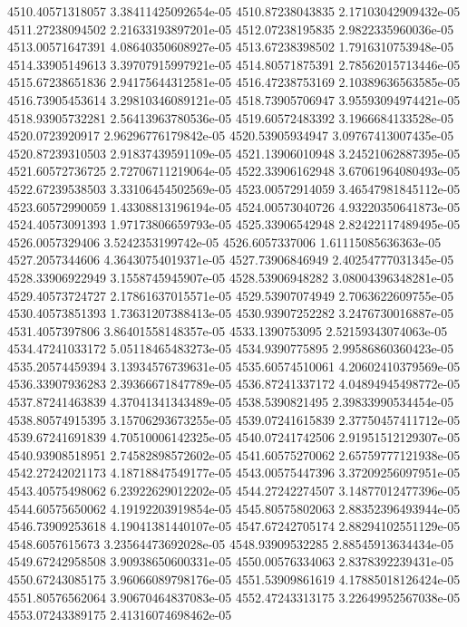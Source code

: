 {4510.40571318057 3.38411425092654e-05
4510.87238043835 2.17103042909432e-05
4511.27238094502 2.21633193897201e-05
4512.07238195835 2.9822335960036e-05
4513.00571647391 4.08640350608927e-05
4513.67238398502 1.7916310753948e-05
4514.33905149613 3.39707915997921e-05
4514.80571875391 2.78562015713446e-05
4515.67238651836 2.94175644312581e-05
4516.47238753169 2.10389636563585e-05
4516.73905453614 3.29810346089121e-05
4518.73905706947 3.95593094974421e-05
4518.93905732281 2.56413963780536e-05
4519.60572483392 3.1966684133528e-05
4520.0723920917 2.96296776179842e-05
4520.53905934947 3.09767413007435e-05
4520.87239310503 2.91837439591109e-05
4521.13906010948 3.24521062887395e-05
4521.60572736725 2.72706711219064e-05
4522.33906162948 3.67061964080493e-05
4522.67239538503 3.33106454502569e-05
4523.00572914059 3.46547981845112e-05
4523.60572990059 1.43308813196194e-05
4524.00573040726 4.93220350641873e-05
4524.40573091393 1.97173806659793e-05
4525.33906542948 2.82422117489495e-05
4526.0057329406 3.5242353199742e-05
4526.6057337006 1.61115085636363e-05
4527.2057344606 4.36430754019371e-05
4527.73906846949 2.40254777031345e-05
4528.33906922949 3.1558745945907e-05
4528.53906948282 3.08004396348281e-05
4529.40573724727 2.17861637015571e-05
4529.53907074949 2.7063622609755e-05
4530.40573851393 1.73631207388413e-05
4530.93907252282 3.2476730016887e-05
4531.4057397806 3.86401558148357e-05
4533.1390753095 2.52159343074063e-05
4534.47241033172 5.05118465483273e-05
4534.9390775895 2.99586860360423e-05
4535.20574459394 3.13934576739631e-05
4535.60574510061 4.20602410379569e-05
4536.33907936283 2.39366671847789e-05
4536.87241337172 4.04894945498772e-05
4537.87241463839 4.37041341343489e-05
4538.5390821495 2.39833990534454e-05
4538.80574915395 3.15706293673255e-05
4539.07241615839 2.37750457411712e-05
4539.67241691839 4.70510006142325e-05
4540.07241742506 2.91951512129307e-05
4540.93908518951 2.74582898572602e-05
4541.60575270062 2.65759777121938e-05
4542.27242021173 4.18718847549177e-05
4543.00575447396 3.37209256097951e-05
4543.40575498062 6.23922629012202e-05
4544.27242274507 3.14877012477396e-05
4544.60575650062 4.19192203919854e-05
4545.80575802063 2.88352396493944e-05
4546.73909253618 4.19041381440107e-05
4547.67242705174 2.88294102551129e-05
4548.6057615673 3.23564473692028e-05
4548.93909532285 2.88545913634434e-05
4549.67242958508 3.90938650600331e-05
4550.00576334063 2.8378392239431e-05
4550.67243085175 3.96066089798176e-05
4551.53909861619 4.17885018126424e-05
4551.80576562064 3.90670464837083e-05
4552.47243313175 3.22649952567038e-05
4553.07243389175 2.41316074698462e-05
}
